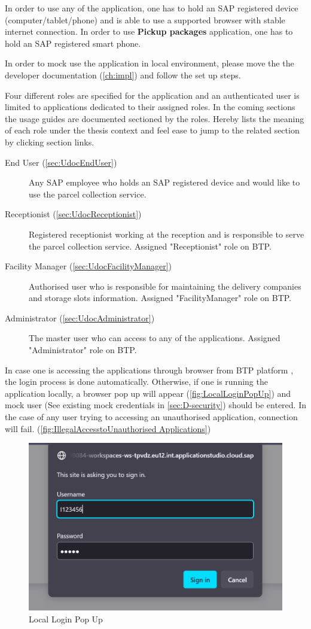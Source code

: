 In order to use any of the application, one has to hold an SAP registered device (computer/tablet/phone) and is able to use a supported browser with stable internet connection. In order to use \textbf{Pickup packages} application, one has to hold an SAP registered smart phone. 

In order to mock use the application in local environment, please move the the developer documentation (\autoref{ch:impl}) and follow the set up steps. 

Four different roles are specified for the application and an authenticated user is limited to applications dedicated to their assigned roles. In the coming sections the usage guides are documented sectioned by the roles. Hereby lists the meaning of each role under the thesis context and feel ease to jump to the related section by clicking section links.

\begin{description}
	\item[End User (\autoref{sec:UdocEndUser})] Any SAP employee who holds an SAP registered device and would like to use the parcel collection service.
	\item[Receptionist (\autoref{sec:UdocReceptionist})] Registered receptionist working at the reception and is responsible to serve the parcel collection service. Assigned "Receptionist" role on BTP.
	\item[Facility Manager (\autoref{sec:UdocFacilityManager})] Authorised user who is responsible for maintaining the delivery companies and storage slots information. Assigned "FacilityManager" role on BTP.
	\item[Administrator (\autoref{sec:UdocAdministrator})] The master user who can access to any of the applications. Assigned "Administrator" role on BTP.
\end{description}

In case one is accessing the applications through browser from BTP platform \cite{btp}, the login process is done automatically. Otherwise, if one is running the application locally, a browser pop up will appear (\autoref{fig:LocalLoginPopUp}) and mock user (See existing mock credentials in \autoref{sec:D-security}) should be entered.
In the case of any user trying to accessing an unauthorised application, connection will fail. (\autoref{fig:IllegalAccesstoUnauthorised Applications})

\begin{figure}[H]
	\centering
	\includegraphics[width=0.5\linewidth]{images/user_doc/overviews/localLogin.png}
	\caption{Local Login Pop Up}
	\label{fig:LocalLoginPopUp}
\end{figure}

